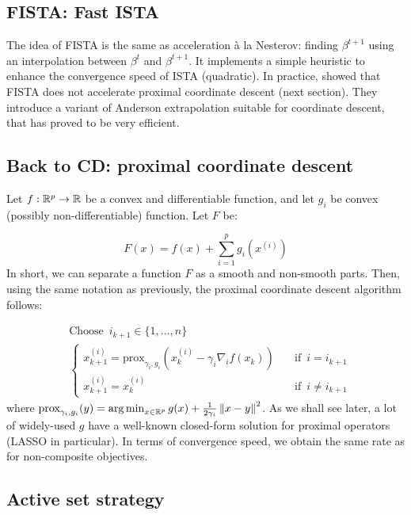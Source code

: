 \documentclass[a4paper,10pt]{article}
\theoremstyle{definition}
\begin{document}
\subsection*{FISTA: Fast ISTA}

The idea of FISTA is the same as acceleration à la Nesterov: finding $\beta^{t+1}$ using
an interpolation between $\beta^t$ and $\beta^{t+1}$. It implements a simple heuristic to 
enhance the convergence speed of ISTA (quadratic). In practice, \cite{Bertrand_Massias_Anderson}
showed that FISTA does not accelerate proximal coordinate descent (next section). They
introduce a variant of Anderson extrapolation suitable for coordinate descent, that has 
proved to be very efficient.

\subsection*{Back to CD: proximal coordinate descent}

Let $f : \mathbb{R}^p \rightarrow \mathbb{R}$ be a convex and differentiable function, and let 
$g_i$ be convex (possibly non-differentiable) function. Let $F$ be:

\begin{equation*}
    F(x) = f(x) + \sum_{i=1}^p g_i(x^{(i)})
\end{equation*}
%
In short, we can separate a function $F$ as a smooth and non-smooth parts. Then, using the same notation 
as previously, the proximal coordinate descent algorithm follows:

\begin{align*}
    &\text{Choose} \enspace i_{k+1} \in \{1, \dots, n\} \\
    &\begin{cases}
        x_{k+1}^{(i)} = \text{prox}_{\gamma_i, g_i}(x_k^{(i)} - \gamma_i \nabla_i f(x_k)) \quad &\text{if} \enspace i = i_{k+1} \\
        x_{k+1}^{(i)} = x_{k}^{(i)} \quad &\text{if} \enspace i \neq i_{k+1} 
    \end{cases}
\end{align*}
%
where $\text{prox}_{\gamma_i, g_i}(y)=\operatorname*{arg\,min}_{x \in \mathbb{R}^p} g(x) + \frac{1}{2\gamma_i} \left \lVert x-y \right \rVert^2$. 
As we shall see later, a lot of widely-used $g$ have a well-known closed-form solution for proximal operators
(LASSO in particular).
%
In terms of convergence speed, we obtain the same rate as for non-composite objectives.

\subsection*{Active set strategy}
\end{document}
